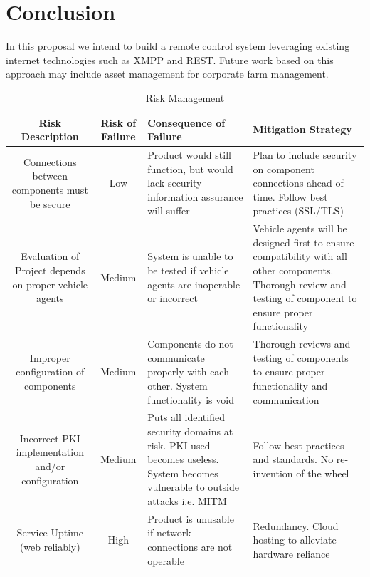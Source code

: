 \documentclass[conference,12pt]{IEEEtran}
\begin{document}
\section{Conclusion}
In this proposal we intend to build a remote control system leveraging existing
internet technologies such as XMPP and REST. Future work based on this approach may
include asset management for corporate farm management.

\printbibliography
\clearpage
\begin{landscape}
\begin{table}%
\caption{Risk Management}
\label{tab:riskmanagement}
\centering
\begin{tabular}{c||c||p{2in}||p{2in}}
\hline
\bfseries Risk Description & \bfseries Risk of Failure & \bfseries Consequence of Failure & \bfseries Mitigation Strategy\\
\hline\hline
Connections between components must be secure
& Low
& Product would still function, but would lack security – information assurance will suffer
& Plan to include security on component connections ahead of time. Follow best practices (SSL/TLS)\\
\hline
Evaluation of Project depends on proper vehicle agents
& Medium
& System is unable to be tested if vehicle agents are inoperable or incorrect
& Vehicle agents will be designed first to ensure compatibility with all other components. Thorough review and testing of component to ensure proper functionality\\
\hline
Improper configuration of components
& Medium
& Components do not communicate properly with each other. System functionality is void
& Thorough reviews and testing of components to ensure proper functionality and communication\\
\hline
Incorrect PKI implementation and/or configuration
& Medium
& Puts all identified security domains at risk. PKI used becomes useless. System becomes vulnerable to outside attacks i.e. MITM
& Follow best practices and standards. No re-invention of the wheel\\
\hline
Service Uptime (web reliably)
& High
& Product is unusable if network connections are not operable
& Redundancy. Cloud hosting to alleviate hardware reliance\\
\hline
\end{tabular}
\end{table}
\end{landscape}
\end{document}
